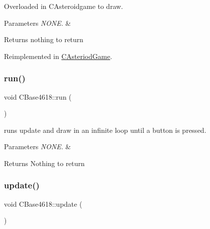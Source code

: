 Overloaded in C\+Asteroidgame to draw. 


\begin{DoxyParams}{Parameters}
{\em N\+O\+N\+E.} & \\
\hline
\end{DoxyParams}
\begin{DoxyReturn}{Returns}
nothing to return 
\end{DoxyReturn}


Reimplemented in \hyperlink{class_c_asteriod_game_a6c14d9f6671a0789b5738cdb5bc0af3a}{C\+Asteriod\+Game}.

\hypertarget{class_c_base4618_a535e816d735d10d6048dd39cd893d393}{}\label{class_c_base4618_a535e816d735d10d6048dd39cd893d393} 
\subsubsection{\texorpdfstring{run()}{run()}}
{\footnotesize\ttfamily void C\+Base4618\+::run (\begin{DoxyParamCaption}{ }\end{DoxyParamCaption})\hspace{0.3cm}{\ttfamily [virtual]}}



runs update and draw in an infinite loop until a button is pressed. 


\begin{DoxyParams}{Parameters}
{\em N\+O\+N\+E.} & \\
\hline
\end{DoxyParams}
\begin{DoxyReturn}{Returns}
Nothing to return 
\end{DoxyReturn}
\hypertarget{class_c_base4618_ae1ac81eaa56ded6600262c361f723cb8}{}\label{class_c_base4618_ae1ac81eaa56ded6600262c361f723cb8} 
\subsubsection{\texorpdfstring{update()}{update()}}
{\footnotesize\ttfamily void C\+Base4618\+::update (\begin{DoxyParamCaption}{ }\end{DoxyParamCaption})\hspace{0.3cm}{\ttfamily [virtual]}}



